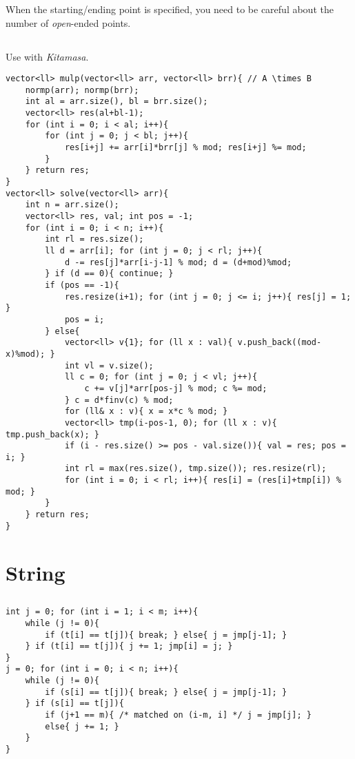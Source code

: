 \documentclass[landscape, 8pt, a4paper, oneside, twocolumn]{extarticle}
\begin{document}
When the starting/ending point is specified, you need to be careful about the number of \textit{open}-ended points.
\subsection{}
Use with \textit{Kitamasa}.
\begin{verbatim}
vector<ll> mulp(vector<ll> arr, vector<ll> brr){ // A \times B
    normp(arr); normp(brr);
    int al = arr.size(), bl = brr.size();
    vector<ll> res(al+bl-1);
    for (int i = 0; i < al; i++){
        for (int j = 0; j < bl; j++){
            res[i+j] += arr[i]*brr[j] % mod; res[i+j] %= mod;
        }
    } return res;
}
vector<ll> solve(vector<ll> arr){
    int n = arr.size();
    vector<ll> res, val; int pos = -1;
    for (int i = 0; i < n; i++){
        int rl = res.size();
        ll d = arr[i]; for (int j = 0; j < rl; j++){
            d -= res[j]*arr[i-j-1] % mod; d = (d+mod)%mod;
        } if (d == 0){ continue; }
        if (pos == -1){
            res.resize(i+1); for (int j = 0; j <= i; j++){ res[j] = 1; }
            pos = i;
        } else{
            vector<ll> v{1}; for (ll x : val){ v.push_back((mod-x)%mod); }
            int vl = v.size();
            ll c = 0; for (int j = 0; j < vl; j++){
                c += v[j]*arr[pos-j] % mod; c %= mod;
            } c = d*finv(c) % mod;
            for (ll& x : v){ x = x*c % mod; }
            vector<ll> tmp(i-pos-1, 0); for (ll x : v){ tmp.push_back(x); }
            if (i - res.size() >= pos - val.size()){ val = res; pos = i; }
            int rl = max(res.size(), tmp.size()); res.resize(rl); 
            for (int i = 0; i < rl; i++){ res[i] = (res[i]+tmp[i]) % mod; }
        }
    } return res;
}
\end{verbatim}
\section{String}
\subsection{}
\begin{verbatim}
int j = 0; for (int i = 1; i < m; i++){
    while (j != 0){
        if (t[i] == t[j]){ break; } else{ j = jmp[j-1]; }
    } if (t[i] == t[j]){ j += 1; jmp[i] = j; }
}
j = 0; for (int i = 0; i < n; i++){
    while (j != 0){
        if (s[i] == t[j]){ break; } else{ j = jmp[j-1]; } 
    } if (s[i] == t[j]){
        if (j+1 == m){ /* matched on (i-m, i] */ j = jmp[j]; }
        else{ j += 1; }
    }
}
\end{verbatim}
\end{document}
